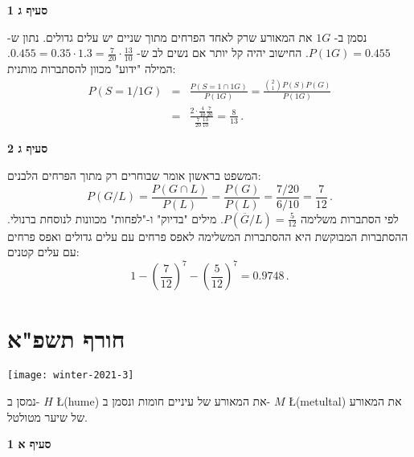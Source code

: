 \textbf{סעיף ג 1}

נסמן ב-%
$1G$
את המאורע שרק לאחד הפרחים מתוך שניים יש עלים גדולים. נתון ש-%
$P(1G)=0.455$.
החישוב יהיה קל יותר אם נשים לב ש-%
$0.455=0.35\cdot 1.3=\frac{7}{20}\cdot \frac{13}{10}$.
המילה "ידוע" מכוון להסתברות מותנית:
\begin{eqnarray*}
P(S=1/1G)&=&\frac{P(S=1 \cap 1G)}{P(1G)}=\frac{{2\choose 1}P(S)P(G)}{P(1G)}\\
&=&\frac{2\cdot\frac{4}{10}\frac{7}{20}}{\frac{7}{20}\frac{13}{10}}=\frac{8}{13}\,.
\end{eqnarray*}

\textbf{סעיף ג 2}

המשפט בראשון אומר שבוחרים רק מתוך הפרחים הלבנים:
\[
P(G/L)=\frac{P(G\cap L)}{P(L)}=\frac{P(G)}{P(L)}=\frac{7/20}{6/10}=\frac{7}{12}\,.
\]
לפי הסתברות משלימה
$P(\overline{G}/L)=\frac{5}{12}$.
מילים "בדיוק" ו-"לפחות" מכוונות לנוסחת ברנולי. ההסתברות המבוקשת היא ההסתברות המשלימה לאפס פרחים עם עלים גדולים ואפס פרחים עם עלים קטנים:
\[
1-\left(\frac{7}{12}\right)^7-\left(\frac{5}{12}\right)^7=0.9748\,.
\]


\newpage


\section{חורף תשפ"א}

\begin{center}
\texttt{[image: winter-2021-3]}
\end{center}

נמסן ב-%
$H$ \L{(hume)}
את המאורע של עיניים חומות ונסמן ב-%
$M$ \L{(metultal)}
את המאורע של שיער מטולטל.

\textbf{סעיף א 1}

